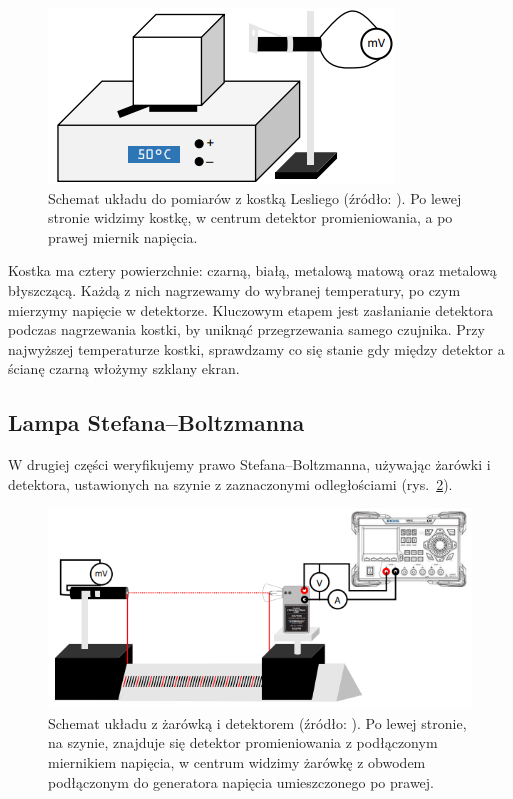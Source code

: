\documentclass[12pt]{article}
\begin{document}
\begin{figure}[H]
	\centering
	\includegraphics[scale=0.5]{cube}
	\caption{Schemat układu do pomiarów z kostką Lesliego (źródło: \cite{skrypt}). Po lewej stronie widzimy kostkę, w centrum detektor promieniowania, a po prawej miernik napięcia.}
	\label{fig:cube_diagram}
\end{figure}

Kostka ma cztery powierzchnie: czarną, białą, metalową matową oraz metalową błyszczącą. Każdą z nich nagrzewamy do wybranej temperatury, po czym mierzymy napięcie w detektorze. Kluczowym etapem jest zasłanianie detektora podczas nagrzewania kostki, by uniknąć przegrzewania samego czujnika.
Przy najwyższej temperaturze kostki, sprawdzamy co się stanie gdy między detektor a ścianę czarną włożymy szklany ekran.

\subsection{Lampa Stefana–Boltzmanna}
W drugiej części weryfikujemy prawo Stefana–Boltzmanna, używając żarówki i detektora, ustawionych na szynie z zaznaczonymi odległościami (rys.~\ref{fig:lamp_diagram}). 

\begin{figure}[H]
	\centering
	\includegraphics[scale=0.5]{lamp}
	\caption{Schemat układu z żarówką i detektorem (źródło: \cite{skrypt}). Po lewej stronie, na szynie, znajduje się detektor promieniowania z podłączonym miernikiem napięcia, w centrum widzimy żarówkę z obwodem podłączonym do generatora napięcia umieszczonego po prawej.}
	\label{fig:lamp_diagram}
\end{figure}
\end{document}
